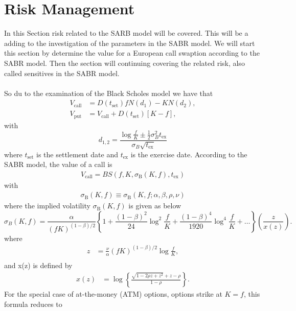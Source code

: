 \section{Risk Management} \label{risk_mang}
In this Section risk related to the SARB model will be covered. 
This will be a adding to the investigation of the parameters in the SABR model.
We will start this section by  determine the value for
a European call swaption according to the SABR model. 
Then the section will continuing covering the related risk, also called sensitives in 
the SABR model. 
\\\\
So du to the examination of the Black Scholes model we have that \cite{Smile}
\begin{align}
    V_{\text{call}} &= D(t_{\text{set}})fN(d_1) - KN(d_2),  \\
    V_{\text{put}} &= V_{\text{call}} + D(t_{\text{set}})[K - f], 
\end{align}
with
\begin{equation}
    d_{1,2} = \frac{\log \frac{f}{K} \pm \frac{1}{2}\sigma_B^2 t_{\text{ex}}}{\sigma_B \sqrt{t_{\text{ex}}}}
\end{equation}
where $t_{\text{set}}$ is the settlement date and $t_{\text{ex}}$ is the exercise date.
According to the SABR model, the value of a call is 
\begin{align}
    V_{\text{call}}= BS(f, K, \sigma_{\text{B}}(K,f),t_{\text{ex}})
\end{align}
with  
\begin{align}
    \sigma_{\text{B}}(K,f) \equiv \sigma_{\text{B}}(K,f;\alpha, \beta, \rho, \nu)
\end{align}
where the implied volatility $\sigma_{\text{B}}(K,f) $ is given as below
\begin{equation}
    \sigma_B(K, f) = \frac{\alpha}{(fK)^{(1-\beta)/2}} \left\{ 1 + \frac{(1-\beta)^2}{24} \log^2 \frac{f}{K} + \frac{(1-\beta)^4}{1920} \log^4 \frac{f}{K} + \ldots \right\} \left( \frac{z}{x(z)} \right).
    \label{sigma_B}
\end{equation}
where
\begin{align}
    z &= \frac{\nu}{\alpha}(fK)^{(1-\beta)/2} \log \frac{f}{K}, \\
\end{align}
and x(z) is defined by
\begin{align}
    x(z) &= \log \left\{ \frac{\sqrt{1-2\rho z + z^2} + z - \rho}{1 - \rho} \right\}.
\end{align}
For the special case of at-the-money (ATM) options, options strike at $K = f$, this formula reduces to
